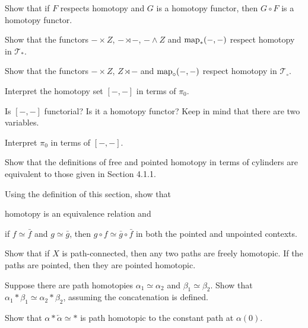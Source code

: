 \bx
Show that if $F$ respects homotopy and $G$ is a homotopy functor, then $G \circ F$ is a homotopy functor.
\ex

\bs
\es

\bp
\ben[label=(\alph*)]
\item Show that the functors $- \times Z$, $ - \rtimes -$, $-\wedge Z$ and $\operatorname{map}_*(- ,- )$ respect homotopy in $\mathcal{T}_*$. 
\item Show that the functors $-\times Z$, $Z\rtimes -$ and $\operatorname{map}_{\circ}(-,-)$ respect homotopy in $\mathcal{T}_{\circ}$. 
\een
\ep

\bs
\ben[label=(\alph*)]
\item 
\item 
\een
\es

\bp
\ben[label=(\alph*)]
\item Interpret the homotopy set $[ - , - ]$ in terms of $\pi_0$.
\item  Is $[ - , - ]$ functorial? Is it a homotopy functor? Keep in mind that there are two variables.
\een 
\ep

\bs
\ben[label=(\alph*)]
\item 
\item 
\een
\es

\bx
Interpret $\pi_0$ in terms of $[ - , - ]$.
\ex

\bs
\es

\bp
Show that the definitions of free and pointed homotopy in terms of cylinders are equivalent to those given in Section 4.1.1.
\ep

\bs
\es

\bp
Using the definition of this section, show that
\ben[label=(\alph*)]
\item homotopy is an equivalence relation and 
\item if $f \simeq \bar{f}$ and $g \simeq \bar{g}$, then $g \circ f\simeq \bar{g}\circ \bar{f}$ in both the pointed and unpointed contexts.
\een
\ep

\bs
\ben[label=(\alph*)]
\item 
\item 
\een
\es

\bx
Show that if $X$ is path-connected, then any two paths are freely homotopic. If the paths are pointed, then they are pointed homotopic.
\ex

\bs
\es

\bp
\ben[label=(\alph*)]
\item Suppose there are path homotopies $\alpha_1 \simeq \alpha_2$ and $\beta_1 \simeq \beta_2$. Show that $\alpha_1 * \beta_1 \simeq \alpha_2 * \beta_2$, assuming the concatenation is defined.
\item Show that $\alpha * \overleftarrow{\alpha}\simeq *$ is path homotopic to the constant path at $\alpha(0)$.

